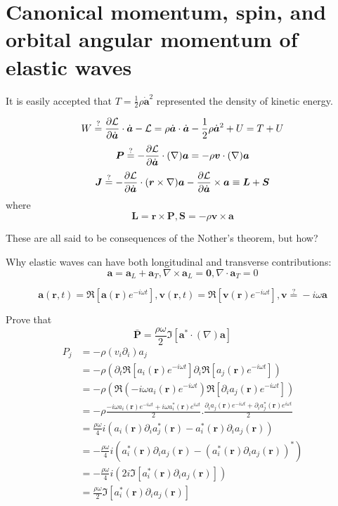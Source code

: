 \section{Canonical momentum, spin, and orbital angular momentum of elastic waves}
It is easily accepted that $T=\frac{1}{2}\rho\dot{\boldsymbol{a}}^2$ represented the density of kinetic energy.

$$
W\overset{?}{=}\frac{\partial \mathcal{L}}{\partial \dot{\boldsymbol{a}}}\cdot \dot{\boldsymbol{a}}-\mathcal{L}=\rho\dot{\boldsymbol{a}}\cdot \dot{\boldsymbol{a}}-\frac{1}{2}\rho\dot{\boldsymbol{a}}^2+U=T+U
$$
$$
\boldsymbol{P}\overset{?}{=}-\frac{\partial \mathcal{L}}{\partial \dot{\boldsymbol{a}}}\cdot (\nabla)\boldsymbol{a}=-\rho \boldsymbol{v}\cdot (\nabla)\boldsymbol{a}
$$
$$
\boldsymbol{J}\overset{?}{=}-\frac{\partial \mathcal{L}}{\partial \dot{\boldsymbol{a}}}\cdot (\boldsymbol{r}\times \nabla)\boldsymbol{a}-\frac{\partial \mathcal{L}}{\partial \dot{\boldsymbol{a}}}\times \boldsymbol{a}\equiv \boldsymbol{L}+\boldsymbol{S}
$$
where
$$
\boldsymbol{L}=\boldsymbol{r}\times \boldsymbol{P},\boldsymbol{S}=-\rho\boldsymbol{v}\times \boldsymbol{a}
$$

These are all said to be consequences of the Nother's theorem, but how?

Why elastic waves can have both longitudinal and transverse contributions:
$$
\boldsymbol{a}=\boldsymbol{a}_{L}+\boldsymbol{a}_{T},\nabla\times \boldsymbol{a}_L=\boldsymbol{0},\nabla\cdot\boldsymbol{a}_{T}=0
$$


$$
\boldsymbol{a}(\boldsymbol{r},t)=\Re[\boldsymbol{a}(\boldsymbol{r})e^{-i\omega t}],\boldsymbol{v}(\boldsymbol{r},t)=\Re[\boldsymbol{v}(\boldsymbol{r})e^{-i\omega t}],\boldsymbol{v}\overset{?}{=}-i\omega\boldsymbol{a}
$$

Prove that 
$$
\bar{\boldsymbol{P}}=\frac{\rho\omega}{2}\Im [\boldsymbol{a}^{*}\cdot (\nabla) \boldsymbol{a}]
$$
$$
\begin{aligned}
P_j&=-\rho (v_i\partial_i)a_j\\
&=-\rho (\partial_t\Re[a_i(\boldsymbol{r})e^{-i\omega t}]\partial_i \Re[a_j(\boldsymbol{r})e^{-i\omega t}])\\
&=-\rho (\Re(-i\omega a_i(\boldsymbol{r})e^{-i\omega t})\Re[\partial_ia_j(\boldsymbol{r})e^{-i\omega t}])\\
&=-\rho \frac{-i\omega a_i(\boldsymbol{r})e^{-i\omega t}+i\omega a_i^{*}(\boldsymbol{r})e^{i\omega t}}{2}.\frac{\partial_ia_j(\boldsymbol{r})e^{-i\omega t}+\partial_ia_j^{*}(\boldsymbol{r})e^{i\omega t}}{2}\\
&=\frac{\rho\omega}{4}i\left(a_i(\boldsymbol{r})\partial_ia_j^{*}(\boldsymbol{r})-a_{i}^{*}(\boldsymbol{r})\partial_{i}a_{j}(\boldsymbol{r})\right)\\
&=-\frac{\rho\omega}{4}i\left(a_{i}^{*}(\boldsymbol{r})\partial_{i}a_{j}(\boldsymbol{r})-(a_{i}^{*}(\boldsymbol{r})\partial_{i}a_{j}(\boldsymbol{r}))^{*}\right)\\
&=-\frac{\rho\omega}{4}i(2i\Im[a_{i}^{*}(\boldsymbol{r})\partial_{i}a_{j}(\boldsymbol{r})])\\
&=\frac{\rho\omega}{2}\Im[a_{i}^{*}(\boldsymbol{r})\partial_{i}a_{j}(\boldsymbol{r})]
\end{aligned}
$$

